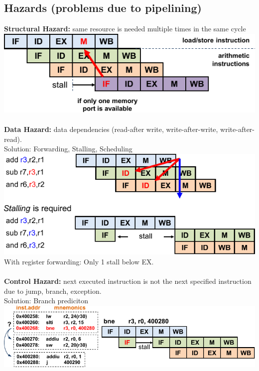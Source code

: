 \begin{sectionbox}
    \subsection{Hazards (problems due to pipelining)}
	\textbf{Structural Hazard:} same resource is needed multiple times in the same cycle\\
		\includegraphics[width = 0.9\columnwidth]{./img/hazard_structural}\\
	\\
	\textbf{Data Hazard:} data dependencies (read-after write, write-after-write, write-after-read).\\
		Solution: Forwarding, Stalling, Scheduling\\
		\includegraphics[width = \columnwidth]{./img/hazard_data}\\
		With register forwarding: Only 1 stall below EX.\\ 
	\\
	\textbf{Control Hazard:} next executed instruction is not the next specified instruction due to jump, branch, exception.\\
		Solution: Branch prediciton\\
		\includegraphics[width = \columnwidth]{./img/hazard_control}\\
\end{sectionbox}


